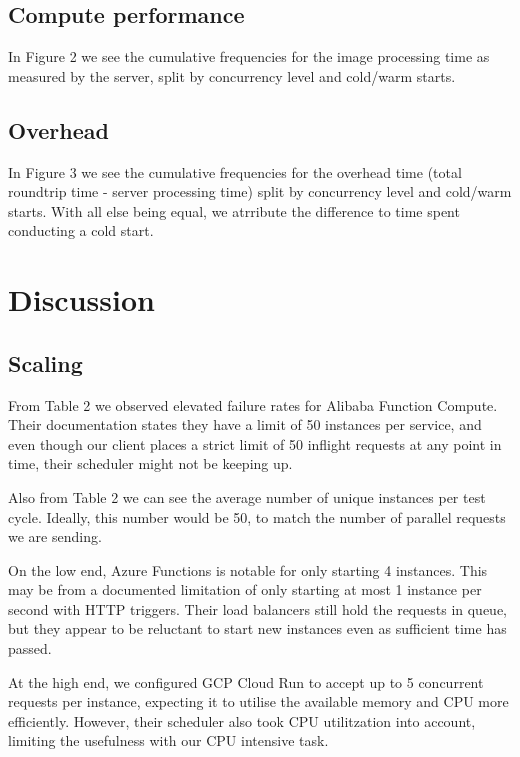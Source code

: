 \documentclass[11pt]{article}
\begin{document}
\subsection{Compute performance}
In Figure 2 %
we see the cumulative frequencies for the image processing time
as measured by the server, split by concurrency level and cold/warm starts.


\subsection{Overhead}

In Figure 3 %
we see the cumulative frequencies for the overhead time
(total roundtrip time - server processing time) %
split by concurrency level and cold/warm starts.
With all else being equal,
we atrribute the difference to time spent conducting a cold start.





\section{Discussion}

\subsection{Scaling}
From Table 2 %
we observed elevated failure rates for Alibaba Function Compute.
Their documentation %
states they have a limit of 50 instances per service,
and even though our client places a strict limit of 50 inflight requests at any point in time,
their scheduler might not be keeping up.

Also from Table 2 %
we can see the average number of unique instances per test cycle.
Ideally, this number would be 50,
to match the number of parallel requests we are sending.

On the low end,
Azure Functions is notable for only starting 4 instances.
This may be from a documented limitation %
of only starting at most 1 instance per second with HTTP triggers.
Their load balancers still hold the requests in queue,
but they appear to be reluctant to start new instances even as sufficient time has passed.

At the high end,
we configured GCP Cloud Run to accept up to 5 concurrent requests per instance,
expecting it to utilise the available memory and CPU more efficiently.
However, their scheduler also took CPU utilitzation into account,
limiting the usefulness with our CPU intensive task.
\end{document}
